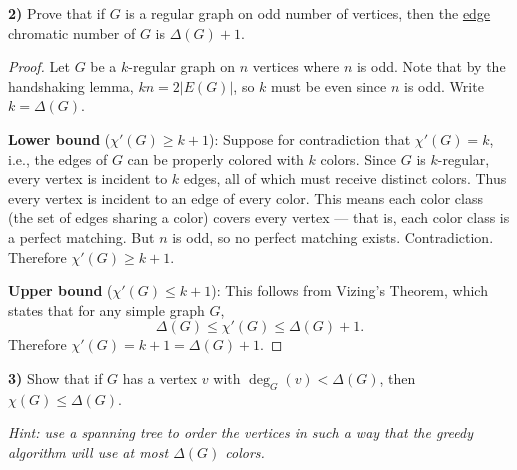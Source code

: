 \documentclass[12pt]{article}
\begin{document}
\textbf{2)} Prove that if $G$ is a regular graph on odd number of vertices, then the \underline{edge} chromatic number of $G$ is $\Delta(G)+1$.

\medskip

\begin{proof}
Let $G$ be a $k$-regular graph on $n$ vertices where $n$ is odd. Note that by the handshaking lemma, $kn = 2|E(G)|$, so $k$ must be even since $n$ is odd. Write $k = \Delta(G)$.

\textbf{Lower bound} ($\chi'(G) \geq k + 1$): Suppose for contradiction that $\chi'(G) = k$, i.e., the edges of $G$ can be properly colored with $k$ colors. Since $G$ is $k$-regular, every vertex is incident to $k$ edges, all of which must receive distinct colors. Thus every vertex is incident to an edge of every color. This means each color class (the set of edges sharing a color) covers every vertex --- that is, each color class is a perfect matching. But $n$ is odd, so no perfect matching exists. Contradiction. Therefore $\chi'(G) \geq k + 1$.

\textbf{Upper bound} ($\chi'(G) \leq k + 1$): This follows from Vizing's Theorem, which states that for any simple graph $G$,
\[\Delta(G) \leq \chi'(G) \leq \Delta(G) + 1.\]
Therefore $\chi'(G) = k + 1 = \Delta(G) + 1$.
\end{proof}

\textbf{3)} Show that if $G$ has a vertex $v$ with $\deg_G(v) < \Delta(G)$, then $\chi(G) \leq \Delta(G)$.

\medskip

\textit{Hint: use a spanning tree to order the vertices in such a way that the greedy algorithm will use at most $\Delta(G)$ colors.}

\medskip
\end{document}
